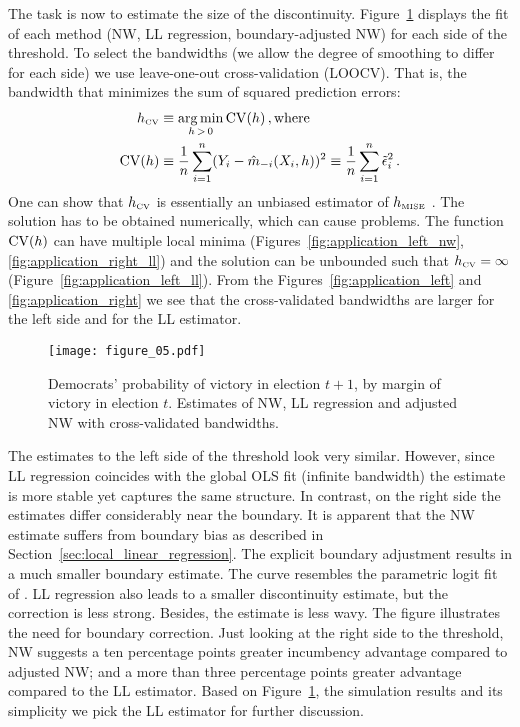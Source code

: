 The task is now to estimate the size of the discontinuity.
Figure~\ref{fig:application_fits} displays the fit of each method (NW, LL regression, boundary-adjusted NW) for each side of the threshold.
To select the bandwidths (we allow the degree of smoothing to differ for each side) we use leave-one-out cross-validation (LOOCV).
That is, the bandwidth that minimizes the sum of squared prediction errors:
\begin{align}
	h_{\text{\tiny CV}} &\equiv \operatorname*{arg\,min}_{h \,>\, 0} \operatorname{CV}(h) \,, \text{where} \\
	\operatorname{CV}(h) &\equiv \frac{1}{n} \sum_{i = 1}^{n} (Y_i - \hat{m}_{-i}(X_i, h))^2 \equiv \frac{1}{n} \sum_{i = 1}^{n} \tilde{\epsilon}_i^2 \,.
\end{align}  
One can show that $h_{\text{\tiny CV}}$ is essentially an unbiased estimator of $h_{\text{\tiny MISE}}$ \parencite[Theorem~19.7]{Hansen_2022}.
The solution has to be obtained numerically, which can cause problems.
The function $\operatorname{CV}(h)$ can have multiple local minima (Figures~\ref{fig:application_left_nw}, \ref{fig:application_right_ll})
and the solution can be unbounded such that $h_{\text{\tiny CV}} = \infty$ (Figure~\ref{fig:application_left_ll}).
From the Figures~\ref{fig:application_left} and \ref{fig:application_right} we see that the cross-validated bandwidths are larger for the left side and for the LL estimator.  

\begin{figure}
	\centering
	\texttt{[image: figure\_05.pdf]}
	\caption{Democrats' probability of victory in election $t+1$, by margin of victory in election $t$.
			 Estimates of NW, LL regression and adjusted NW with cross-validated bandwidths.}
	\label{fig:application_fits}
\end{figure}

The estimates to the left side of the threshold look very similar.
However, since LL regression coincides with the global OLS fit (infinite bandwidth) the estimate is more stable yet captures the same structure.
In contrast, on the right side the estimates differ considerably near the boundary.
It is apparent that the NW estimate suffers from boundary bias as described in Section~\ref{sec:local_linear_regression}.
The explicit boundary adjustment results in a much smaller boundary estimate.
The curve resembles the parametric logit fit of \textcite[Fig.\ 5a]{Lee_2008}.
LL regression also leads to a smaller discontinuity estimate, but the correction is less strong.
Besides, the estimate is less wavy.
The figure illustrates the need for boundary correction.
Just looking at the right side to the threshold, NW suggests a ten percentage points greater incumbency advantage compared to adjusted NW;
and a more than three percentage points greater advantage compared to the LL estimator.
Based on Figure~\ref{fig:application_fits}, the simulation results and its simplicity we pick the LL estimator for further discussion.

